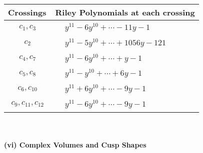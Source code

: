 \documentclass[1p]{elsarticle_modified}
\theoremstyle{definition}
\begin{document}
\begin{tabular}{m{50pt}|m{274pt}}
Crossings & \hspace{64pt}Riley Polynomials at each crossing \\
\hline $$\begin{aligned}c_{1},c_{3}\end{aligned}$$&$\begin{aligned}
&y^{11}-6 y^{10}+\cdots-11 y-1
\end{aligned}$\\
\hline $$\begin{aligned}c_{2}\end{aligned}$$&$\begin{aligned}
&y^{11}-5 y^{10}+\cdots+1056 y-121
\end{aligned}$\\
\hline $$\begin{aligned}c_{4},c_{7}\end{aligned}$$&$\begin{aligned}
&y^{11}-6 y^{10}+\cdots+y-1
\end{aligned}$\\
\hline $$\begin{aligned}c_{5},c_{8}\end{aligned}$$&$\begin{aligned}
&y^{11}- y^{10}+\cdots+6 y-1
\end{aligned}$\\
\hline $$\begin{aligned}c_{6},c_{10}\end{aligned}$$&$\begin{aligned}
&y^{11}+6 y^{10}+\cdots-9 y-1
\end{aligned}$\\
\hline $$\begin{aligned}c_{9},c_{11},c_{12}\end{aligned}$$&$\begin{aligned}
&y^{11}-6 y^{10}+\cdots-9 y-1
\end{aligned}$\\
\hline
\end{tabular}\\~\\
\newpage\flushleft \textbf{(vi) Complex Volumes and Cusp Shapes}
\end{document}
